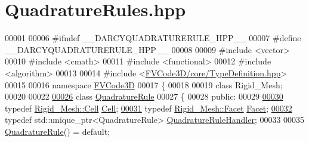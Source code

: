 \hypertarget{QuadratureRules_8hpp_source}{}\section{Quadrature\+Rules.\+hpp}
\label{QuadratureRules_8hpp_source}

\begin{DoxyCode}
00001 
00006 \textcolor{preprocessor}{#ifndef \_\_DARCYQUADRATURERULE\_HPP\_\_}
00007 \textcolor{preprocessor}{#define \_\_DARCYQUADRATURERULE\_HPP\_\_}
00008 
00009 \textcolor{preprocessor}{#include <vector>}
00010 \textcolor{preprocessor}{#include <cmath>}
00011 \textcolor{preprocessor}{#include <functional>}
00012 \textcolor{preprocessor}{#include <algorithm>}
00013 
00014 \textcolor{preprocessor}{#include <\hyperlink{TypeDefinition_8hpp}{FVCode3D/core/TypeDefinition.hpp}>}
00015 
00016 \textcolor{keyword}{namespace }\hyperlink{namespaceFVCode3D}{FVCode3D}
00017 \{
00018 
00019 \textcolor{keyword}{class }Rigid\_Mesh;
00020 
00022 
\hypertarget{QuadratureRules_8hpp_source.tex_l00026}{}\hyperlink{classFVCode3D_1_1QuadratureRule}{00026} \textcolor{keyword}{class }\hyperlink{classFVCode3D_1_1QuadratureRule}{QuadratureRule}
00027 \{
00028 \textcolor{keyword}{public}:
00029 
\hypertarget{QuadratureRules_8hpp_source.tex_l00030}{}\hyperlink{classFVCode3D_1_1QuadratureRule_af2f37bb8e8b8c3fd7554eaacaf4e5f3c}{00030}     \textcolor{keyword}{typedef} \hyperlink{classFVCode3D_1_1Rigid__Mesh_1_1Cell}{Rigid\_Mesh::Cell} \hyperlink{classFVCode3D_1_1QuadratureRule_af2f37bb8e8b8c3fd7554eaacaf4e5f3c}{Cell};
\hypertarget{QuadratureRules_8hpp_source.tex_l00031}{}\hyperlink{classFVCode3D_1_1QuadratureRule_af6e825c3626d437e50e5da733cd0ca1b}{00031}     \textcolor{keyword}{typedef} \hyperlink{classFVCode3D_1_1Rigid__Mesh_1_1Facet}{Rigid\_Mesh::Facet} \hyperlink{classFVCode3D_1_1QuadratureRule_af6e825c3626d437e50e5da733cd0ca1b}{Facet};
\hypertarget{QuadratureRules_8hpp_source.tex_l00032}{}\hyperlink{classFVCode3D_1_1QuadratureRule_aa112834316b236e0a9072b09fd94d9cc}{00032}     \textcolor{keyword}{typedef} std::unique\_ptr<QuadratureRule> \hyperlink{classFVCode3D_1_1QuadratureRule_aa112834316b236e0a9072b09fd94d9cc}{QuadratureRuleHandler};
00033 
00035     \hyperlink{classFVCode3D_1_1QuadratureRule_a3eeb28f09a0f1bd920790698bf309192}{QuadratureRule}() = \textcolor{keywordflow}{default};

\end{DoxyCode}

